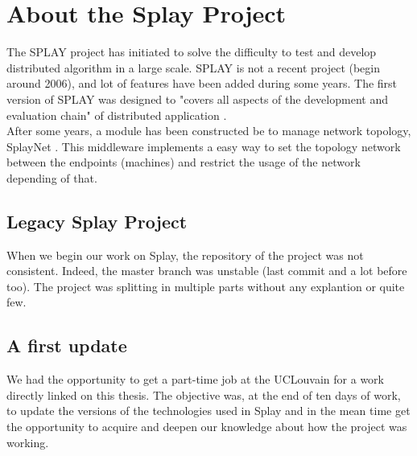 \documentclass{eplmastersthesis}
\begin{document}
    \section{About the Splay Project}

      The SPLAY project has initiated to solve the difficulty to test and
      develop distributed algorithm in a large scale. SPLAY is not a recent
      project (begin around 2006), and lot of features have been added during
      some years. The first version of SPLAY  was designed to "covers all
      aspects of the development and evaluation chain" of distributed
      application \cite{SPLAY}. \\

      After some years, a module has been constructed be to manage network
      topology, SplayNet \cite{SplayNet}. This middleware implements a easy
      way to set the topology network between the endpoints (machines) and
      restrict the usage of the network depending of that.

      \subsection{Legacy Splay Project}

        When we begin our work on Splay, the repository of the
        project \cite{SplayGit} was not consistent. Indeed, the master branch was
        unstable (last commit and a lot before too). The project was splitting in
        multiple parts without any explantion or quite few.

      \subsection{A first update}


        We had the opportunity to get a part-time job at the UCLouvain for
        a work directly linked on this thesis. The objective was, at the end
        of ten days of work, to update the versions of the technologies used
        in Splay and in the mean time get the opportunity to acquire and
        deepen our knowledge about how the project was working.\\
\end{document}
